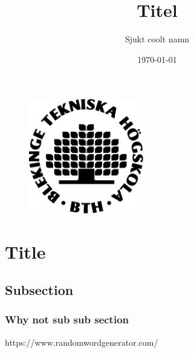 \documentclass[a4paper]{article}
\title{Titel}
\author{Sjukt coolt namn}
\date{\today}
\begin{document}
\maketitle
\begin{figure}
\center
\includegraphics[width=5cm]{bth_logo.jpg}
\end{figure}
\pagebreak

\tableofcontents

\pagebreak

\section{Title} %

\lipsum \cite{Ref1}%

\pagebreak

\subsection{Subsection} %

\lipsum \cite{Ref1}%

\pagebreak

\subsubsection{Why not sub sub section} %

\lipsum \cite{Ref1}%

\begin{thebibliography}{9}

	https://www.randomwordgenerator.com/

\end{thebibliography}
\end{document}

